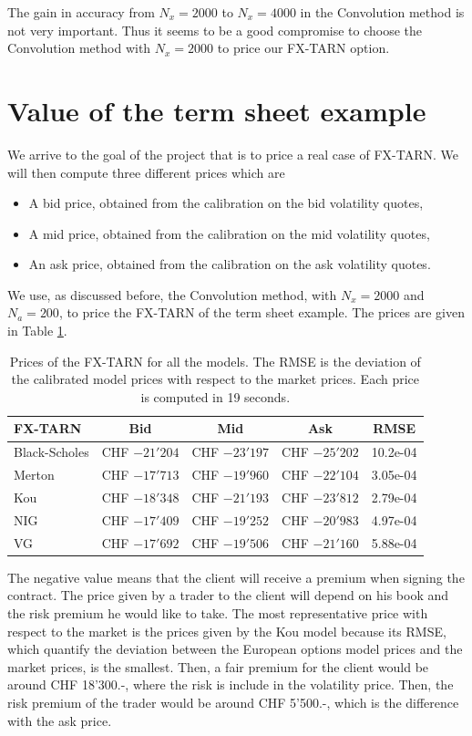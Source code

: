 The gain in accuracy from $N_x = 2000$ to $N_x = 4000$ in the Convolution method is not very important. Thus it seems to be a good compromise to choose the Convolution method with $N_x = 2000$ to price our FX-TARN option.

\section{Value of the term sheet example}
\label{sec:res:TS}
We arrive to the goal of the project that is to price a real case of FX-TARN. We will then compute three different prices which are
\begin{itemize}
\item A bid price, obtained from the calibration on the bid volatility quotes,
\item A mid price, obtained from the calibration on the mid volatility quotes,
\item An ask price, obtained from the calibration on the ask volatility quotes.
\end{itemize}

We use, as discussed before, the Convolution method, with $N_x = 2000$ and $N_a = 200$, to price the FX-TARN of the term sheet example. The prices are given in Table \ref{tab:prices}.

\begin{table}[!ht]
\centering
  \begin{tabular}{l||c|c|c||c}
    \toprule
    \textbf{FX-TARN} & Bid & Mid & Ask & RMSE \\
    \toprule
   Black-Scholes 	& CHF $-21'204$ & CHF $-23'197$ & CHF $-25'202$ & 10.2e-04\\
   Merton 			& CHF $-17'713$ & CHF $-19'960$ & CHF $-22'104$ & 3.05e-04\\
   Kou 				& CHF $-18'348$ & CHF $-21'193$ & CHF $-23'812$ & 2.79e-04\\
   NIG 				& CHF $-17'409$ & CHF $-19'252$ & CHF $-20'983$ & 4.97e-04\\
   VG 				& CHF $-17'692$ & CHF $-19'506$ & CHF $-21'160$ & 5.88e-04\\
    \bottomrule
  \end{tabular}
  \vspace{5pt}
  \caption{\label{tab:prices} Prices of the FX-TARN for all the models. The RMSE is the deviation of the calibrated model prices with respect to the market prices. Each price is computed in 19 seconds.}
\end{table}

The negative value means that the client will receive a premium when signing the contract. The price given by a trader to the client will depend on his book and the risk premium he would like to take. The most representative price with respect to the market is the prices given by the Kou model because its RMSE, which quantify the deviation between the European options model prices and the market prices, is the smallest. Then, a fair premium for the client would be around CHF 18'300.-, where the risk is include in the volatility price. Then, the risk premium of the trader would be around CHF 5'500.-, which is the difference with the ask price.


